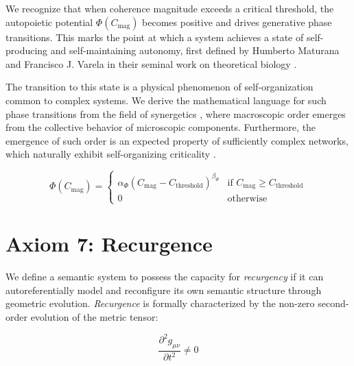 We recognize that when coherence magnitude exceeds a critical threshold, the autopoietic potential \(\Phi(C_{\text{mag}})\) becomes positive and drives generative phase transitions. This marks the point at which a system achieves a state of self-producing and self-maintaining autonomy, first defined by Humberto Maturana and Francisco J. Varela in their seminal work on theoretical biology \autocite{MaturanaVarela1980}.

The transition to this state is a physical phenomenon of self-organization common to complex systems. We derive the mathematical language for such phase transitions from the field of synergetics \autocite{Haken1983}, where macroscopic order emerges from the collective behavior of microscopic components. Furthermore, the emergence of such order is an expected property of sufficiently complex networks, which naturally exhibit self-organizing criticality \autocite{BakTangWiesenfeld1987}.

\begin{equation}
\Phi(C_{\text{mag}}) = \begin{cases}
\alpha_{\Phi} (C_{\text{mag}} - C_{\text{threshold}})^{\beta_{\Phi}} & \text{if } C_{\text{mag}} \geq C_{\text{threshold}} \\
0 & \text{otherwise}
\end{cases}
\end{equation}


\section{Axiom 7: Recurgence}
\label{1.7:axiom_7_recurgence}

We define a semantic system to possess the capacity for \textit{recurgency} if it can autoreferentially model and reconfigure its own semantic structure through geometric evolution. \textit{Recurgence} is formally characterized by the non-zero second-order evolution of the metric tensor:

\begin{equation}
\frac{\partial^2 g_{\mu\nu}}{\partial t^2} \neq 0
\end{equation} 